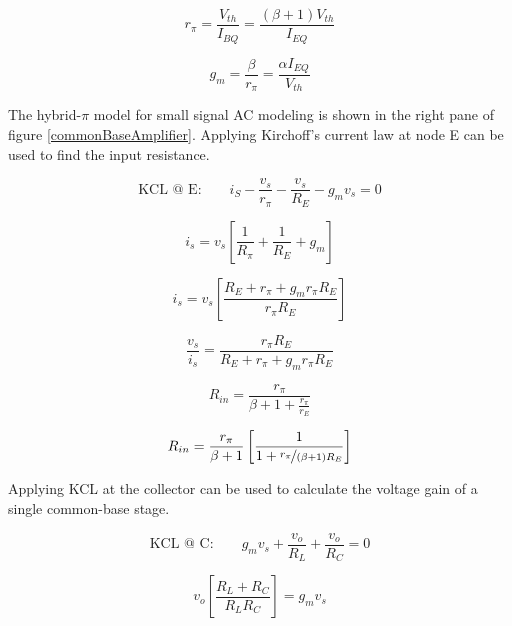 \documentclass[titlepage, letterpaper, 11pt]{article}
\begin{document}
\begin{equation}
r_{\pi}=\frac{V_{th}}{I_{BQ}}
=\frac{(\beta+1)V_{th}}{I_{EQ}}
\label{rPi}
\end{equation}

\begin{equation}
g_{m}=\frac{\beta}{r_{\pi}}
=\frac{\alpha I_{EQ}}{V_{th}}
\label{gm}
\end{equation}

The hybrid-$\pi$ model for small signal AC modeling is shown in the
right pane of figure \ref{commonBaseAmplifier}. Applying Kirchoff's
current law at node E can be used to find the input resistance.

\begin{equation*}
\textrm{KCL @ E:}\qquad
i_{S}-\frac{v_{s}}{r_{\pi}}-\frac{v_{s}}{R_{E}}-g_{m}v_{s}=0
\end{equation*}

\begin{equation*}
i_{s}=v_{s} \left[ \frac{1}{R_{\pi}}+\frac{1}{R_{E}}+g_{m} \right]
\end{equation*}

\begin{equation*}
i_{s}=v_{s} \left[
\frac{R_{E}+r_{\pi}+g_{m}r_{\pi}R_{E}}
{r_{\pi}R_{E}} \right]
\end{equation*}

\begin{equation*}
\frac{v_{s}}{i_{s}}
=\frac{r_{\pi}R_{E}}{R_{E}+r_{\pi}+g_{m}r_{\pi}R_{E}}
\end{equation*}

\begin{equation*}
R_{in}=\frac{r_{\pi}}{\beta+1+\frac{r_{\pi}}{r_{E}}}
\end{equation*}

\begin{equation}
R_{in}=\frac{r_{\pi}}{\beta+1}
\left[\frac{1}{1+\nicefrac{r_{\pi}}{(\beta+1)R_{E}}}\right]
\label{commonBaseRin}
\end{equation}

Applying KCL at the collector can be used to calculate the voltage
gain of a single common-base stage.

\begin{equation*}
\textrm{KCL @ C:}\qquad
g_{m}v_{s}+\frac{v_{o}}{R_{L}}+\frac{v_{o}}{R_{C}}=0
\end{equation*}

\begin{equation*}
v_{o}\left[\frac{R_{L}+R_{C}}{R_{L}R_{C}}\right]=g_{m}v_{s}
\end{equation*}
\end{document}
